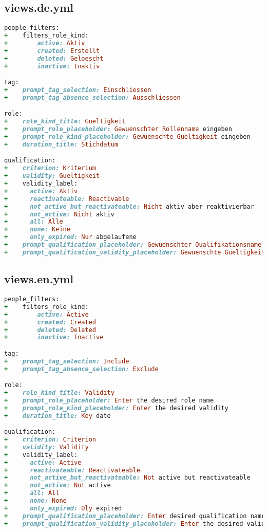 \newpage

\subsection{views.de.yml}
\begin{lstlisting}[language=Ruby]
people_filters:
+    filters_role_kind:
+        active: Aktiv
+        created: Erstellt
+        deleted: Geloescht
+        inactive: Inaktiv

tag:
+    prompt_tag_selection: Einschliessen
+    prompt_tag_absence_selection: Ausschliessen

role:
+    role_kind_title: Gueltigkeit
+    prompt_role_placeholder: Gewuenschter Rollenname eingeben
+    prompt_role_kind_placeholder: Gewuenschte Gueltigkeit eingeben
+    duration_title: Stichdatum

qualification:
+    criterion: Kriterium
+    validity: Gueltigkeit
+    validity_label:
+      active: Aktiv
+      reactivateable: Reactivable
+      not_active_but_reactivateable: Nicht aktiv aber reaktivierbar
+      not_active: Nicht aktiv
+      all: Alle
+      none: Keine
+      only_expired: Nur abgelaufene
+    prompt_qualification_placeholder: Gewuenschter Qualifikationsname
+    prompt_qualification_validity_placeholder: Gewuenschte Gueltigkeit
\end{lstlisting}

\newpage

\subsection{views.en.yml}
\begin{lstlisting}[language=Ruby]
people_filters:
+    filters_role_kind:
+        active: Active
+        created: Created
+        deleted: Deleted
+        inactive: Inactive

tag:
+    prompt_tag_selection: Include
+    prompt_tag_absence_selection: Exclude

role:
+    role_kind_title: Validity
+    prompt_role_placeholder: Enter the desired role name
+    prompt_role_kind_placeholder: Enter the desired validity
+    duration_title: Key date

qualification:
+    criterion: Criterion
+    validity: Validity
+    validity_label:
+      active: Active
+      reactivateable: Reactivateable
+      not_active_but_reactivateable: Not active but reactivateable
+      not_active: Not active
+      all: All
+      none: None
+      only_expired: Oly expired
+    prompt_qualification_placeholder: Enter desired qualification name
+    prompt_qualification_validity_placeholder: Enter the desired validity
\end{lstlisting}

